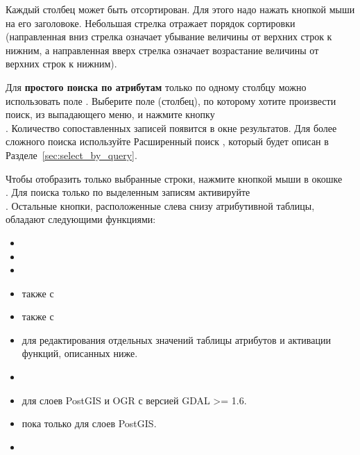 Каждый столбец может быть отсортирован. Для этого надо нажать кнопкой мыши
на его заголовоке. Небольшая стрелка отражает порядок сортировки (направленная
вниз стрелка означает убывание величины от верхних строк к нижним, а
направленная вверх стрелка означает возрастание величины от верхних строк
к нижним).

Для \textbf{простого поиска по атрибутам} только по одному столбцу можно
использовать поле . Выберите поле (столбец), по которому
хотите произвести поиск, из выпадающего меню, и нажмите кнопку \\ .
Количество сопоставленных записей появится в окне результатов. Для более
сложного поиска используйте Расширенный поиск , который будет
описан в Разделе~\ref{sec:select_by_query}.

Чтобы отобразить только выбранные строки, нажмите кнопкой мыши в окошке \\
. Для поиска только по выделенным
записям активируйте \\
. Остальные
кнопки, расположенные слева снизу атрибутивной таблицы, обладают следующими
функциями:

\begin{itemize}[label=--]
\item {}
\item {}
\item {}
\item {}
также с 
\item {}
также с 
\item {} для
редактирования отдельных значений таблицы атрибутов и активации функций,
описанных ниже.
\item {}
\item {} для слоев PostGIS
и OGR с версией GDAL >= 1.6.
\item {} пока только для
слоев PostGIS.
\item {}
\end{itemize}

